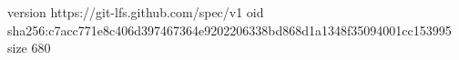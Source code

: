 version https://git-lfs.github.com/spec/v1
oid sha256:c7acc771e8c406d397467364e9202206338bd868d1a1348f35094001cc153995
size 680

